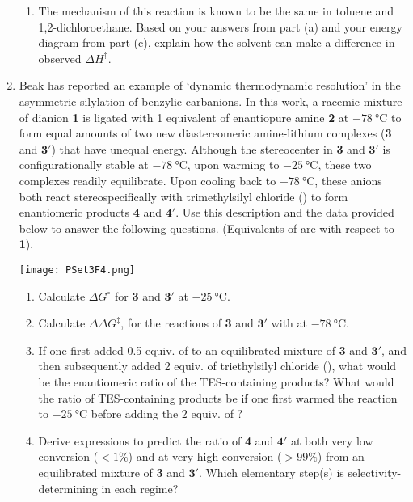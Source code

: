 \documentclass[../psets.tex]{subfiles}
\begin{document}
\begin{enumerate}
\begin{enumerate}
        \item The mechanism of this reaction is known to be the same in toluene and 1,2-dichloroethane. Based on your answers from part (a) and your energy diagram from part (c), explain how the solvent can make a difference in observed $\Delta H^\ddagger$.
    \end{enumerate}
    \pagebreak
    \item Beak has reported an example of `dynamic thermodynamic resolution' in the asymmetric silylation of benzylic carbanions. In this work, a racemic mixture of dianion \textbf{1} is ligated with 1 equivalent of enantiopure amine \textbf{2} at $-\SI{78}{\celsius}$ to form equal amounts of two new diastereomeric amine-lithium complexes (\textbf{3} and $\bm{3'}$) that have unequal energy. Although the  stereocenter in \textbf{3} and $\bm{3'}$ is configurationally stable at $-\SI{78}{\celsius}$, upon warming to $-\SI{25}{\celsius}$, these two complexes readily equilibrate. Upon cooling back to $-\SI{78}{\celsius}$, these anions both react stereospecifically with trimethylsilyl chloride () to form enantiomeric products \textbf{4} and $\bm{4'}$. Use this description and the data provided below to answer the following questions. (Equivalents of  are with respect to \textbf{1}).
    \begin{center}
        \texttt{[image: PSet3F4.png]}
    \end{center}
    \begin{enumerate}
        \item Calculate $\Delta G^\circ$ for \textbf{3} and $\bm{3'}$ at $-\SI{25}{\celsius}$.
        \item Calculate $\Delta\Delta G^\ddagger$, for the reactions of \textbf{3} and $\bm{3'}$ with  at $-\SI{78}{\celsius}$.
        \item If one first added 0.5 equiv. of  to an equilibrated mixture of \textbf{3} and $\bm{3'}$, and then subsequently added 2 equiv. of triethylsilyl chloride (), what would be the enantiomeric ratio of the TES-containing products? What would the ratio of TES-containing products be if one first warmed the reaction to $-\SI{25}{\celsius}$ before adding the 2 equiv. of ?
        \item Derive expressions to predict the ratio of \textbf{4} and $\bm{4'}$ at both very low conversion ($<1\%$) and at very high conversion ($>99\%$) from an equilibrated mixture of \textbf{3} and $\bm{3'}$. Which elementary step(s) is selectivity-determining in each regime?
    \end{enumerate}
\end{enumerate}
\end{document}
